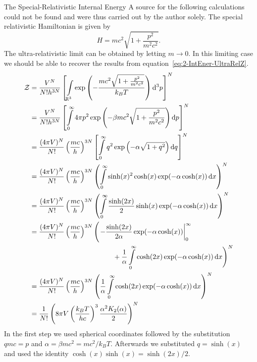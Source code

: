 \begin{subsection}{The Special-Relativistic Internal Energy}
A source for the following calculations could not be found and were thus carried out by the author solely.
The special relativistic Hamiltonian is given by
\begin{equation}
	H=mc^2\sqrt{1+\frac{p^2}{m^2 c^2}}.
	\label{eq:2-IntEner-Rel-Hamiltonian}
\end{equation}
The ultra-relativistic limit can be obtained by letting $m\rightarrow0$.
In this limiting case we should be able to recover the results from equation~\eqref{eq:2-IntEner-UltraRelZ}.
\begin{align}
	\Z 	&= \frac{V^N}{N!h^{3N}}\left[\int\limits_{\R^3}\exp\left(- \frac{mc^2\sqrt{1+\frac{p^2}{m^2 c^2}}}{k_B T}\right)\diff^3 p\right]^N\label{2-IntEner-EQ1}\\
		&= \frac{V^N}{N!h^{3N}}\left[\int\limits_0^\infty 4\pi p^2\exp\left(-\beta mc^2\sqrt{1+\frac{p^2}{m^2 c^2}} \right)\diff p\right]^N\\
		&= \frac{(4\pi V)^N}{N!}\left(\frac{mc}{h}\right)^{3N}\left[\int\limits_0^\infty q^2\exp\left(-\alpha\sqrt{1+q^2}\right)\diff q\right]^N\\
		&= \frac{(4\pi V)^N}{N!}\left(\frac{mc}{h}\right)^{3N}\left(\int\limits_0^\infty\sinh(x)^2\cosh(x)\exp(-\alpha\cosh(x))\diff x \right)^N\\
		&= \frac{(4\pi V)^N}{N!}\left(\frac{mc}{h}\right)^{3N}\left(\int\limits_0^\infty\frac{\sinh(2x)}{2}\sinh(x)\exp(-\alpha\cosh(x))\diff x \right)^N\\
		&= \frac{(4\pi V)^N}{N!}\left(\frac{mc}{h}\right)^{3N}\Biggl(\left.-\frac{\sinh(2x)}{2\alpha}\exp(-\alpha\cosh(x))\right|_0^\infty\\
		&\hspace{12em} + \frac{1}{\alpha}\int\limits_0^\infty\cosh(2x)\exp(-\alpha\cosh(x))\diff x  \Biggr)^N\\
		&= \frac{(4\pi V)^N}{N!}\left(\frac{mc}{h}\right)^{3N}\left(\frac{1}{\alpha}\int\limits_0^\infty\cosh(2x)\exp(-\alpha\cosh(x))\diff x  \right)^N\\
		&= \frac{1}{N!}\left(8\pi V\left(\frac{k_B T}{hc}\right)^{3}\frac{\alpha^2 K_2(\alpha)}{2}\right)^N
		\label{2-IntEner-PartFunc}
\end{align}
In the first step we used spherical coordinates followed by the substitution $qmc=p$ and $\alpha=\beta mc^2=mc^2/k_B T$.
Afterwards we substituted $q=\sinh(x)$ and used the identity $\cosh(x)\sinh(x)=\sinh(2x)/2$.

\end{subsection}
